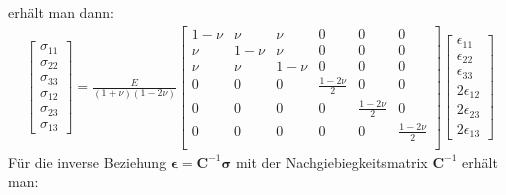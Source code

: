 \documentclass[letterpaper,10pt,german]{jupyterBook}
\begin{document}
\sphinxAtStartPar
erhält man dann:
\begin{equation}\label{equation:chapters/chapter1/elasticity:generalHook3}
\begin{split}\begin{bmatrix} 
\sigma_{11} \\
\sigma_{22} \\
\sigma_{33} \\
\sigma_{12} \\
\sigma_{23} \\
\sigma_{13} 
\end{bmatrix} = \frac{E}{(1+\nu)(1-2\nu)}\begin{bmatrix}
1-\nu & \nu & \nu & 0 & 0 & 0 \\
\nu & 1-\nu & \nu & 0 & 0 & 0 \\
\nu & \nu & 1-\nu & 0 & 0 & 0 \\
0 & 0 & 0 & \frac{1-2\nu}{2} & 0 & 0 \\
0 & 0 & 0 & 0 & \frac{1-2\nu}{2} & 0 \\
0 & 0 & 0 & 0 & 0 & \frac{1-2\nu}{2} \\ 
\end{bmatrix} \begin{bmatrix} \epsilon_{11} \\ \epsilon_{22} \\ \epsilon_{33} \\ 2\epsilon_{12} \\ 2\epsilon_{23} \\ 2\epsilon_{13} \end{bmatrix}\end{split}
\end{equation}
\sphinxAtStartPar
Für die inverse Beziehung \(\bm{\epsilon} = \bm{C}^{-1} \bm{\sigma}\) mit der Nachgiebiegkeitsmatrix \(\bm{C}^{-1}\) erhält man:
\end{document}
